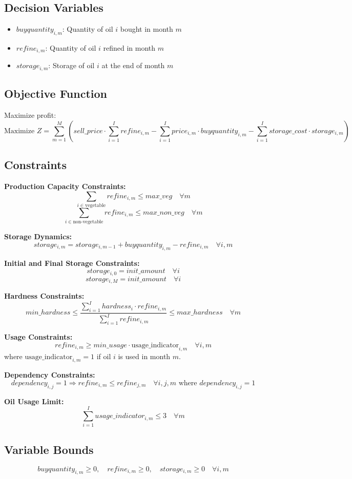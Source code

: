 \documentclass{article}
\begin{document}
\subsection*{Decision Variables}
\begin{itemize}
    \item $buyquantity_{i,m}$: Quantity of oil $i$ bought in month $m$
    \item $refine_{i,m}$: Quantity of oil $i$ refined in month $m$
    \item $storage_{i,m}$: Storage of oil $i$ at the end of month $m$
\end{itemize}

\subsection*{Objective Function}
Maximize profit:
\[
\text{Maximize } Z = \sum_{m=1}^{M} \left( sell\_price \cdot \sum_{i=1}^{I} refine_{i,m} - \sum_{i=1}^{I} price_{i,m} \cdot buyquantity_{i,m} - \sum_{i=1}^{I} storage\_cost \cdot storage_{i,m} \right)
\]

\subsection*{Constraints}

\textbf{Production Capacity Constraints:}
\[
\sum_{i \in \text{vegetable}} refine_{i,m} \leq max\_veg \quad \forall m
\]
\[
\sum_{i \in \text{non-vegetable}} refine_{i,m} \leq max\_non\_veg \quad \forall m
\]

\textbf{Storage Dynamics:}
\[
storage_{i,m} = storage_{i,m-1} + buyquantity_{i,m} - refine_{i,m} \quad \forall i, m
\]

\textbf{Initial and Final Storage Constraints:}
\[
storage_{i,0} = init\_amount \quad \forall i
\]
\[
storage_{i,M} = init\_amount \quad \forall i
\]

\textbf{Hardness Constraints:}
\[
min\_hardness \leq \frac{\sum_{i=1}^{I} hardness_{i} \cdot refine_{i,m}}{\sum_{i=1}^{I} refine_{i,m}} \leq max\_hardness \quad \forall m
\]

\textbf{Usage Constraints:}
\[
refine_{i,m} \geq min\_usage \cdot \text{usage\_indicator}_{i,m} \quad \forall i, m
\]
where $\text{usage\_indicator}_{i,m} = 1$ if oil $i$ is used in month $m$.

\textbf{Dependency Constraints:}
\[
dependency_{i,j} = 1 \Rightarrow refine_{i,m} \leq refine_{j,m} \quad \forall i,j,m \text{ where } dependency_{i,j} = 1
\]

\textbf{Oil Usage Limit:}
\[
\sum_{i=1}^{I} usage\_indicator_{i,m} \leq 3 \quad \forall m
\]

\subsection*{Variable Bounds}
\[
buyquantity_{i,m} \geq 0, \quad refine_{i,m} \geq 0, \quad storage_{i,m} \geq 0 \quad \forall i, m
\]
\end{document}
